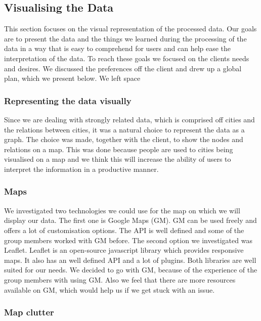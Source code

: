 \subsection{Visualising the Data}
This section focuses on the visual representation of the processed data. Our goals are to present the data and the things we learned during the processing of the data in a way that is easy to comprehend for users and can help ease the interpretation of the data.
To reach these goals we focused on the clients needs and desires. We discussed the preferences off the client and drew up a global plan, which we present below. We left space 

\subsubsection{Representing the data visually}
Since we are dealing with strongly related data, which is comprised off cities and the relations between cities, it was a natural choice to represent the data as a graph.
The choice was made, together with the client, to show the nodes and relations on a map. This was done because people are used to cities being visualised on a map and we think this will increase the ability of users to interpret the information in a productive manner.

\subsubsection{Maps}
We investigated two technologies we could use for the map on which we will display our data. The first one is Google Maps (GM). GM can be used freely and offers a lot of customisation options. The API is well defined and some of the group members worked with GM before. The second option we investigated was Leaflet. Leaflet is an open-source javascript library which provides responsive maps. It also has an well defined API and a lot of plugins.
Both libraries are well suited for our needs. 
We decided to go with GM, because of the experience of the group members with using GM. Also we feel that there are more resources available on GM, which would help us if we get stuck with an issue.

\subsubsection{Map clutter}

